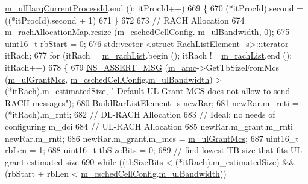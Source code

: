 \begin{DoxyCode}
      \hyperlink{classns3_1_1TdBetFfMacScheduler_a0776a2fc3f7186d7ec4491dc21706596}{m\_ulHarqCurrentProcessId}.end (); itProcId++)
669     \{
670       (*itProcId).second = ((*itProcId).second + 1) %
671     \}
672 
673   \textcolor{comment}{// RACH Allocation}
674   \hyperlink{classns3_1_1TdBetFfMacScheduler_a985948ee40a0d721009dea792474ee51}{m\_rachAllocationMap}.resize (\hyperlink{classns3_1_1TdBetFfMacScheduler_a3e53aae0259501332769cd6ca4b74800}{m\_cschedCellConfig}.
      \hyperlink{structns3_1_1FfMacCschedSapProvider_1_1CschedCellConfigReqParameters_a5ab5b102878e6e7e7727a14af4a64d2f}{m\_ulBandwidth}, 0);
675   uint16\_t rbStart = 0;
676   std::vector <struct RachListElement\_s>::iterator itRach;
677   \textcolor{keywordflow}{for} (itRach = \hyperlink{classns3_1_1TdBetFfMacScheduler_ac88efaa3ffc00af6dd71b21d2bef0448}{m\_rachList}.begin (); itRach != \hyperlink{classns3_1_1TdBetFfMacScheduler_ac88efaa3ffc00af6dd71b21d2bef0448}{m\_rachList}.end (); itRach++)
678     \{
679       \hyperlink{assert_8h_aff5ece9066c74e681e74999856f08539}{NS\_ASSERT\_MSG} (\hyperlink{classns3_1_1TdBetFfMacScheduler_a3ba724ed3776a6cb493df6dd91b810d6}{m\_amc}->GetTbSizeFromMcs (\hyperlink{classns3_1_1TdBetFfMacScheduler_ae0ced77c5d773079c66921b86561de8c}{m\_ulGrantMcs}, 
      \hyperlink{classns3_1_1TdBetFfMacScheduler_a3e53aae0259501332769cd6ca4b74800}{m\_cschedCellConfig}.\hyperlink{structns3_1_1FfMacCschedSapProvider_1_1CschedCellConfigReqParameters_a5ab5b102878e6e7e7727a14af4a64d2f}{m\_ulBandwidth}) > (*itRach).m\_estimatedSize, \textcolor{stringliteral}{" Default UL
       Grant MCS does not allow to send RACH messages"});
680       BuildRarListElement\_s newRar;
681       newRar.m\_rnti = (*itRach).m\_rnti;
682       \textcolor{comment}{// DL-RACH Allocation}
683       \textcolor{comment}{// Ideal: no needs of configuring m\_dci}
684       \textcolor{comment}{// UL-RACH Allocation}
685       newRar.m\_grant.m\_rnti = newRar.m\_rnti;
686       newRar.m\_grant.m\_mcs = \hyperlink{classns3_1_1TdBetFfMacScheduler_ae0ced77c5d773079c66921b86561de8c}{m\_ulGrantMcs};
687       uint16\_t rbLen = 1;
688       uint16\_t tbSizeBits = 0;
689       \textcolor{comment}{// find lowest TB size that fits UL grant estimated size}
690       \textcolor{keywordflow}{while} ((tbSizeBits < (*itRach).m\_estimatedSize) && (rbStart + rbLen < 
      \hyperlink{classns3_1_1TdBetFfMacScheduler_a3e53aae0259501332769cd6ca4b74800}{m\_cschedCellConfig}.\hyperlink{structns3_1_1FfMacCschedSapProvider_1_1CschedCellConfigReqParameters_a5ab5b102878e6e7e7727a14af4a64d2f}{m\_ulBandwidth}))

\end{DoxyCode}
